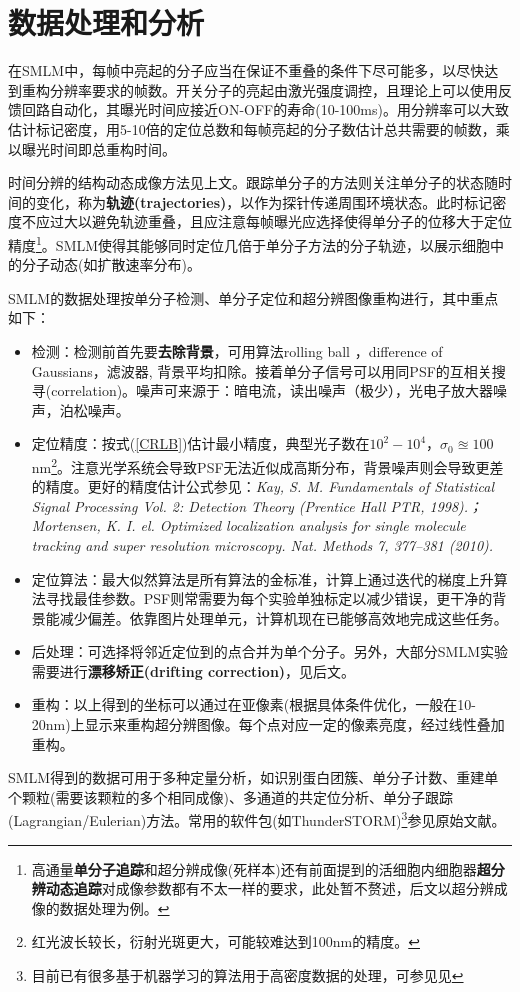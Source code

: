 \documentclass[12pt]{ctexart}
\begin{document}
\section*{数据处理和分析}
在SMLM中，每帧中亮起的分子应当在保证不重叠的条件下尽可能多，以尽快达到重构分辨率要求的帧数。开关分子的亮起由激光强度调控，且理论上可以使用反馈回路自动化，其曝光时间应接近ON-OFF的寿命(10-100ms)。用分辨率可以大致估计标记密度，用5-10倍的定位总数和每帧亮起的分子数估计总共需要的帧数，乘以曝光时间即总重构时间。
\par 时间分辨的结构动态成像方法见上文。跟踪单分子的方法则关注单分子的状态随时间的变化，称为\textbf{轨迹(trajectories)}，以作为探针传递周围环境状态。此时标记密度不应过大以避免轨迹重叠，且应注意每帧曝光应选择使得单分子的位移大于定位精度\footnote{高通量\textbf{单分子追踪}和超分辨成像(死样本)还有前面提到的活细胞内细胞器\textbf{超分辨动态追踪}对成像参数都有不太一样的要求，此处暂不赘述，后文以超分辨成像的数据处理为例。}。SMLM使得其能够同时定位几倍于单分子方法的分子轨迹，以展示细胞中的分子动态(如扩散速率分布)。
\par SMLM的数据处理按单分子检测、单分子定位和超分辨图像重构进行，其中重点如下：
\begin{itemize}
    \item 检测：检测前首先要\textbf{去除背景}，可用算法rolling ball ，difference of Gaussians，滤波器, 背景平均扣除。接着单分子信号可以用同PSF的互相关搜寻(correlation)。噪声可来源于：暗电流，读出噪声（极少），光电子放大器噪声，泊松噪声。
    \item 定位精度：按式(\ref{CRLB})估计最小精度，典型光子数在$10^2-10^4$，$\sigma_0\approxeq100$nm\footnote{红光波长较长，衍射光斑更大，可能较难达到100nm的精度。}。注意光学系统会导致PSF无法近似成高斯分布，背景噪声则会导致更差的精度。更好的精度估计公式参见：\textit{Kay, S. M. Fundamentals of Statistical Signal Processing Vol. 2: Detection Theory (Prentice Hall PTR, 1998).；Mortensen, K. I. el. Optimized localization analysis for single molecule tracking and super resolution microscopy. Nat. Methods 7, 377–381 (2010).}
    \item 定位算法：最大似然算法是所有算法的金标准，计算上通过迭代的梯度上升算法寻找最佳参数。PSF则常需要为每个实验单独标定以减少错误，更干净的背景能减少偏差。依靠图片处理单元，计算机现在已能够高效地完成这些任务。
    \item 后处理：可选择将邻近定位到的点合并为单个分子。另外，大部分SMLM实验需要进行\textbf{漂移矫正(drifting correction)}，见后文。
    \item 重构：以上得到的坐标可以通过在亚像素(根据具体条件优化，一般在10-20nm)上显示来重构超分辨图像。每个点对应一定的像素亮度，经过线性叠加重构。
\end{itemize}
\par SMLM得到的数据可用于多种定量分析，如识别蛋白团簇、单分子计数、重建单个颗粒(需要该颗粒的多个相同成像)、多通道的共定位分析、单分子跟踪(Lagrangian/Eulerian)方法。常用的软件包(如ThunderSTORM)\footnote{目前已有很多基于机器学习的算法用于高密度数据的处理，可参见见\cite{hyunDevelopmentDeepLearningBasedSingleMolecule2022}}参见原始文献。
\end{document}
